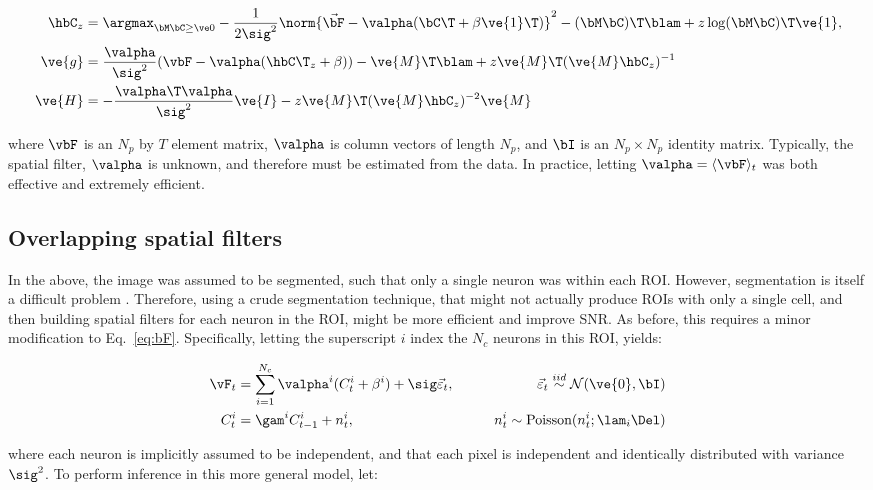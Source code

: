 \begin{align} 
\hbC_{\zzz} 
&= \az  -\frac{1}{2 \sig^2} \norm{\vec{\bF} - \valpha (\bC\T +\beta\ve{1}\T)}^2 - (\bM \bC )\T \blam  + \zzz \log(\bM \bC)\T\ve{1},  \label{eq:eta4}\\
\ve{g} &= \frac{\valpha}{\sig^2}(\vbF -\valpha({\hbC\T}_{\zzz} + \beta)) - \ve{M}\T\blam + \zzz \ve{M}\T (\ve{M} \hbC_{\zzz})^{-1} \label{eq:g2} \\
\ve{H} &= -\frac{\valpha\T \valpha}{\sig^2} \ve{I} - \zzz \ve{M}\T (\ve{M} \hbC_{\zzz})^{-2} \ve{M} \label{eq:H2}
\end{align}

\noindent where $\vbF$ is an $N_p$ by $T$ element matrix, $\valpha$ is column vectors of length $N_p$, and $\bI$ is an $N_p \times N_p$ identity matrix.  Typically, the spatial filter, $\valpha$ is unknown, and therefore must be estimated from the data.  In practice, letting $\valpha=\langle \vbF \rangle_t$ was both effective and extremely efficient.




\subsection{Overlapping spatial filters} \label{sec:methods:overlapping}

In the above, the image was assumed to be segmented, such that only a single neuron was within each ROI.  However, segmentation is itself a difficult problem \cite{}.  Therefore, using a crude segmentation technique, that might not actually produce ROIs with only a single cell, and then building spatial filters for each neuron in the ROI, might be more efficient and improve SNR.  As before, this requires a minor modification to Eq.~\eqref{eq:bF}.  Specifically, letting the superscript $i$ index the $N_c$ neurons in this ROI, yields:  

\begin{align}
\vF_t &= \sum_{i=1}^{N_c}\valpha^i (C^i_t + \beta^i) +  \sig\vec{\varepsilon}_t, \qquad &\vec{\varepsilon}_t \overset{iid}{\sim} \mathcal{N}(\ve{0},\bI)   \\
C^i_t &= \gam^i C^i_{t-1} + n^i_t, & n^i_t \sim \text{Poisson}(n^i_t; \lam_i \Del)
\end{align}

\noindent where each neuron is implicitly assumed to be independent, and that each pixel is independent and identically distributed with variance $\sig^2$.  To perform inference in this more general model, let:

